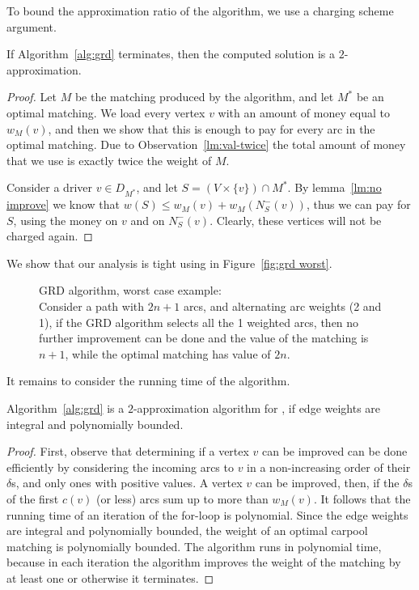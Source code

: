 To bound the approximation ratio of the algorithm, we use a charging
scheme argument.

\begin{lemma}
If Algorithm~\ref{alg:grd} terminates, then the computed solution is a
$2$-approximation.
\end{lemma}
\begin{proof}
Let $M$ be the matching produced by the algorithm, and let $M^*$ be an
optimal matching.  We load every vertex $v$ with an amount of money
equal to $w_M(v)$, and then we show that this is enough to pay for
every arc in the optimal matching.  Due to
Observation~\ref{lm:val-twice} the total amount of money that we use
is exactly twice the weight of $M$.

Consider a driver $v \in D_{M^*}$, and let $S = (V \times \{v\}) \cap
M^*$.  By lemma~\ref{lm:no improve} we know that $w(S) \leq w_M(v) +
w_M(N^-_S(v))$, thus we can pay for $S$, using the money on $v$ and on
$N^-_S(v)$.  Clearly, these vertices will not be charged again.
\end{proof}

We show that our analysis is tight using in Figure~\ref{fig:grd
worst}.

\begin{figure}
\centering

\caption[]{
\label{fig:grd worst}
GRD algorithm, worst case example: \\
Consider a path with $2n + 1$ arcs,
and alternating arc weights (2 and 1),
if the GRD algorithm selects all the 1 weighted arcs,
then no further improvement can be done and the value of the matching is $n + 1$,
while the optimal matching has value of $2n$.
}
\end{figure}

It remains to consider the running time of the algorithm.

\begin{theorem}
\label{thm:ls}
Algorithm~\ref{alg:grd} is a $2$-approximation algorithm for \carpool,
if edge weights are integral and polynomially bounded.
\end{theorem}
\begin{proof}
First, observe that determining if a vertex $v$ can be improved can be
done efficiently by considering the incoming arcs to $v$ in a
non-increasing order of their $\delta$s, and only ones with positive
values.  A vertex $v$ can be improved, then, if the $\delta$s of the
first $c(v)$ (or less) arcs sum up to more than $w_M(v)$.
%
It follows that the running time of an iteration of the for-loop is
polynomial.  Since the edge weights are integral and polynomially
bounded, the weight of an optimal carpool matching is polynomially
bounded.  The algorithm runs in polynomial time, because in each
iteration the algorithm improves the weight of the matching by at
least one or otherwise it terminates.
\end{proof}

